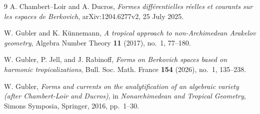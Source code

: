 \documentclass[11pt]{article}
\begin{document}



\begin{thebibliography}{9}
A. Chambert--Loir and A. Ducros,
\emph{Formes diff\'erentielles r\'eelles et courants sur les espaces de
Berkovich}, arXiv:1204.6277v2, 25 July 2025.

W. Gubler and K. K\"unnemann,
\emph{A tropical approach to non-Archimedean Arakelov geometry},
Algebra Number Theory \textbf{11} (2017), no.~1, 77--180.

W. Gubler, P. Jell, and J. Rabinoff,
\emph{Forms on Berkovich spaces based on harmonic tropicalizations},
Bull. Soc. Math. France \textbf{154} (2026), no.~1, 135--238.

W. Gubler,
\emph{Forms and currents on the analytification of an algebraic variety
(after Chambert-Loir and Ducros)}, in \emph{Nonarchimedean and Tropical
Geometry}, Simons Symposia, Springer, 2016, pp.~1--30.
\end{thebibliography}
\end{document}
